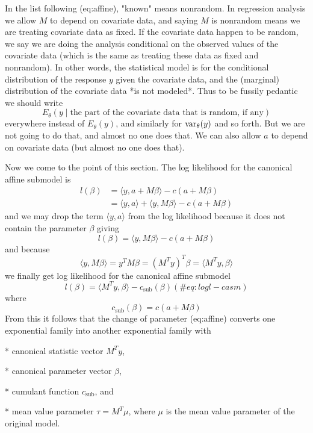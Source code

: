 \documentclass[11pt]{article}
\begin{document}
In the list following \@ref(eq:affine), "known" means nonrandom.
In regression analysis we allow $M$ to depend on covariate data,
and saying $M$ is nonrandom means we are treating covariate data as fixed.
If the covariate data happen to be random, we say we are doing the
analysis conditional on the observed values of the covariate data
(which is the same as treating these data as fixed and nonrandom).
In other words, the statistical model is for the conditional distribution
of the response $y$ given the covariate data, and
the (marginal) distribution of the covariate data *is not modeled*.
Thus to be fussily pedantic we should write
$$
   E_\theta(y \mid \text{the part of the covariate data that is random, if any})
$$
everywhere instead of $E_\theta(y)$, and similarly
for $\mathop{\rm var}\nolimits_\theta(y)$ and so forth.
But we are not going to do that, and almost no one does that.
We can also allow $a$ to depend on covariate data
(but almost no one does that).

Now we come to the point of this
section.  The log likelihood for the canonical affine submodel is
\begin{align*}
   l(\beta)
   & =
   \langle y, a + M \beta \rangle - c(a + M \beta)
   \\
   & =
   \langle y, a \rangle + \langle y, M \beta \rangle - c(a + M \beta)
\end{align*}
and we may drop the term $\langle y, a \rangle$ from the log likelihood
because it does not contain the parameter $\beta$ giving
$$
   l(\beta) = \langle y, M \beta \rangle - c(a + M \beta)
$$
and because
$$
   \langle y, M \beta \rangle = y^T M \beta = (M^T y)^T \beta
   = \langle M^T y, \beta \rangle
$$
we finally get log likelihood for the canonical affine submodel
\begin{equation}
   l(\beta) = \langle M^T y, \beta \rangle - c_\text{sub}(\beta)
   (\#eq:logl-casm)
\end{equation}
where
$$
   c_\text{sub}(\beta) = c(a + M \beta)
$$
From this it follows that the change of parameter \@ref(eq:affine)
converts one exponential family into another exponential family with

 * canonical statistic vector $M^T y$,

 * canonical parameter vector $\beta$,

 * cumulant function $c_\text{sub}$, and

 * mean value parameter $\tau = M^T \mu$, where $\mu$ is the mean value
   parameter of the original model.
\end{document}
